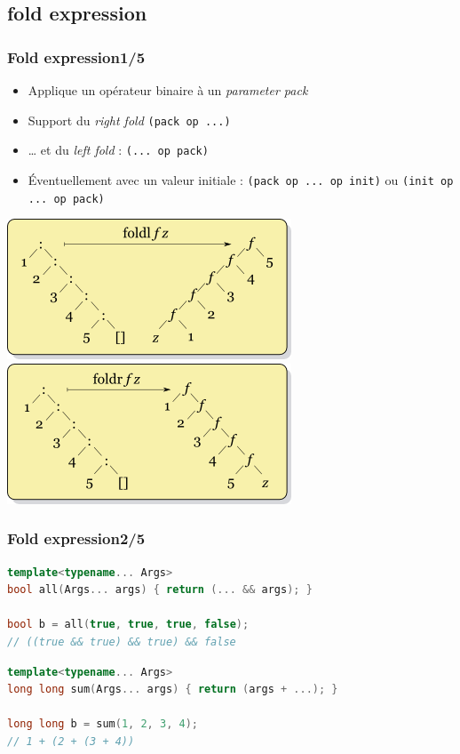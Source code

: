 \documentclass[C++.tex]{subfiles}
\begin{document}
\subsection*{fold expression}
\begin{frame}[fragile]
	\frametitle{Fold expression\titlehfill{}1/5}
	\begin{itemize}
		\item Applique un opérateur binaire à un \textit{parameter pack}


		\item Support du \textit{right fold} \lstinline|(pack op ...)|
		\item \ldots{} et du \textit{left fold} : \lstinline|(... op pack)|
		\item Éventuellement avec un valeur initiale : \lstinline|(pack op ... op init)| ou \lstinline|(init op ... op pack)|
	\end{itemize}

	\begin{center}
		\includegraphics[height=0.30\textheight]{input_src/Left-fold-transformation.png} \includegraphics[height=0.30\textheight]{input_src/Right-fold-transformation.png}
	\end{center}
\end{frame}

\begin{frame}[fragile]
	\frametitle{Fold expression\titlehfill{}2/5}
	\begin{lstlisting}[language=C++]
template<typename... Args>
bool all(Args... args) { return (... && args); }

bool b = all(true, true, true, false);
// ((true && true) && true) && false\end{lstlisting}

	\begin{lstlisting}[language=C++]
template<typename... Args>
long long sum(Args... args) { return (args + ...); }

long long b = sum(1, 2, 3, 4);
// 1 + (2 + (3 + 4))\end{lstlisting}
\end{frame}
\end{document}
